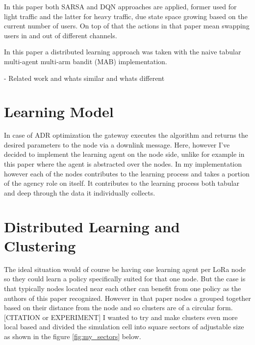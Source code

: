 In this paper \cite{rl_lora_sarsa_dqn} both SARSA and DQN
approaches are applied, former used for light traffic and the
latter for heavy traffic, due state space growing based on the 
current number of users. On top of that the actions in 
that paper mean swapping users in and out of different channels.

In this paper \cite{rl_distributed_mab} a distributed learning approach was taken with the naive tabular multi-agent multi-arm bandit (MAB) implementation.

 - Related work and whats similar and whats different

\section{Learning Model}

In case of ADR optimization the gateway executes the algorithm
and returns the desired parameters to the node via a downlink 
message. Here, however I've decided to implement the learning 
agent on the node side, unlike for example in this paper 
\cite{rl_lora_sarsa_dqn} where the agent is abstracted over the 
nodes. In my implementation however each of the nodes
contributes to the learning process and takes a portion of the
agency role on itself. It contributes to the learning process
both tabular and deep through the data it individually collects.

\section{Distributed Learning and Clustering}
The ideal situation would of course be having one learning agent
per LoRa node so they could learn a policy specifically suited for that one node. But the case is that typically nodes located 
near each other can benefit from one policy as the authors of this paper \cite{rl_lora_original} recognized. However 
in that paper nodes a grouped together based on their 
distance from the node and so clusters are of a circular 
form. [CITATION or EXPERIMENT] I wanted to try and make clusters
even more local based and divided the simulation cell into 
square sectors of adjustable size as shown in the figure 
\ref{fig:my_sectors} below.

